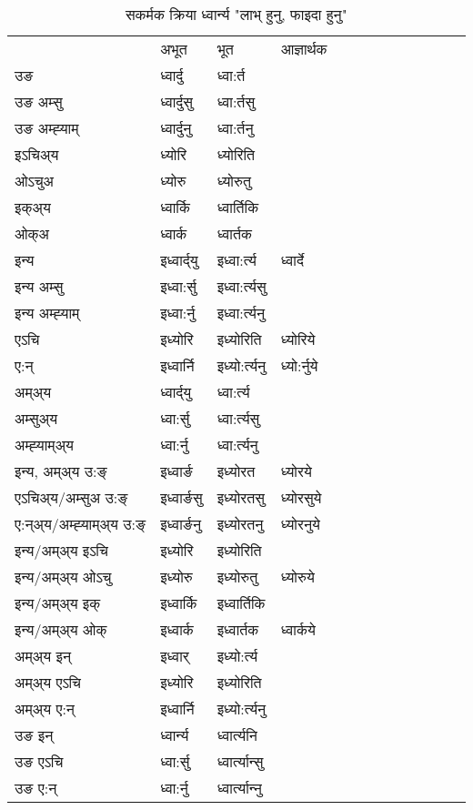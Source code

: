 \begin{table}[H]
\centering
\caption{\label{ort.vt} सकर्मक क्रिया  ध्वार्न्य  "लाभ् हुनु, फाइदा हुनु"  }
\begin{tabular}{l|l|l|l|l|l|l|l|l|l|l|l|l}  \toprule
&अभूत & भूत & आज्ञार्थक \\ 
उङ &ध्वार्दु &ध्वा:र्त \\ 
उङ अम्सु&ध्वार्दुसु &ध्वा:र्तसु \\ 
उङ अम्ह्‍याम्&ध्वार्दुनु &ध्वा:र्तनु \\ 
इऽचिअ्य &ध्योरि &ध्योरिति   \\ 
ओऽचुअ        &ध्योरु &ध्योरुतु   \\ 
इक्अ्य&ध्वार्कि &ध्वार्तिकि   \\ 
ओक्अ &ध्वार्क &ध्वार्तक   \\ 
इन्य & इध्वार्द्‌यु  & इध्वा:र्त्य &ध्वार्दे  \\ 
इन्य अम्सु& इध्वा:र्सु  & इध्वा:र्त्यसु   \\ 
इन्य अम्ह्‍याम्& इध्वा:र्नु  & इध्वा:र्त्यनु   \\ 
एऽचि & इध्योरि & इध्योरिति &ध्योरिये    \\ 
ए:न् & इध्वार्नि  & इध्यो:र्त्यनु &ध्यो:र्नुये  \\ 
अम्अ्य & ध्वार्द्‌यु  & ध्वा:र्त्य  \\ 
अम्सुअ्य & ध्वा:र्सु & ध्वा:र्त्यसु  \\ 
अम्ह्‍याम्अ्य & ध्वा:र्नु  & ध्वा:र्त्यनु \\ 
\midrule
इन्य, अम्अ्य उ:ङ्‌ &इध्वार्ङ &इध्योरत &ध्योरये \\ 
एऽचिअ्य/अम्सुअ उ:ङ्‌ &इध्वार्ङसु &इध्योरतसु &ध्योरसुये \\ 
ए:न्अ्य/अम्ह्‍याम्अ्य उ:ङ्‌ &इध्वार्ङनु &इध्योरतनु &ध्योरनुये \\ 
इन्य/अम्अ्य इऽचि &इध्योरि &इध्योरिति    \\ 
इन्य/अम्अ्य ओऽचु &इध्योरु &इध्योरुतु  &ध्योरुये  \\ 
इन्य/अम्अ्य इक् &इध्वार्कि &इध्वार्तिकि   \\ 
इन्य/अम्अ्य ओक् &इध्वार्क &इध्वार्तक  &ध्वार्कये  \\ 
अम्अ्य इन् & इध्वार् & इध्यो:र्त्य   \\ 
अम्अ्य एऽचि & इध्योरि & इध्योरिति    \\ 
अम्अ्य ए:न् & इध्वार्नि  & इध्यो:र्त्यनु  \\ 
\midrule
उङ इन् & ध्वार्न्य  & ध्वार्त्यनि  \\ 
उङ एऽचि & ध्वा:र्सु  & ध्वार्त्यान्सु   \\ 
उङ ए:न्& ध्वा:र्नु  & ध्वार्त्यान्‍नु   \\ 
\bottomrule
\end{tabular}
\end{table}


